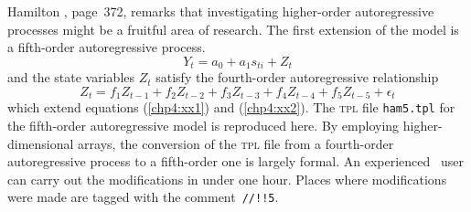 \documentclass{admbmanual}
\begin{document}
Hamilton \cite{hamilton1989}, page~372, remarks that investigating higher-order
autoregressive processes might be a fruitful area of research.
The first extension of the model is a fifth-order autoregressive process.
\begin{equation}
{
Y_t=a_0+a_1s_{ti}+Z_t }
\label{chp5:yy1}
\end{equation}
and the state variables $Z_t$ satisfy the fourth-order autoregressive
relationship
\begin{equation}
{
Z_t=f_1Z_{t-1}+f_2Z_{t-2}+f_3Z_{t-3}+f_4Z_{t-4}+f_5Z_{t-5}+
  \epsilon_t}
\label{chp5:yy2}
\end{equation}
which extend equations (\ref{chp4:xx1}) %
and (\ref{chp4:xx2}). %
The \textsc{tpl} file \texttt{ham5.tpl} for the fifth-order autoregressive model
is reproduced here. By employing higher-dimensional arrays, the conversion of
the \textsc{tpl} file from a fourth-order autoregressive process to a
fifth-order one is largely formal. An experienced \ADM\ user can carry out the
modifications in under one hour. Places where modifications were made are tagged
with the comment~\texttt{//!!5}.
\end{document}
